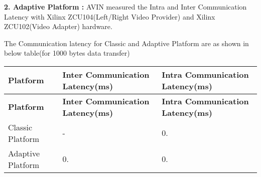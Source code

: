 {\bfseries 2. Adaptive Platform \+:} A\+V\+IN measured the Intra and Inter Communication Latency with Xilinx Z\+C\+U104(Left/\+Right Video Provider) and Xilinx Z\+C\+U102(\+Video Adapter) hardware.


\begin{DoxyItemize}
\item The Communication latency for Classic and Adaptive Platform are as shown in below table(for 1000 bytes data transfer)
\end{DoxyItemize}

\tabulinesep=1mm
\begin{longtabu} spread 0pt [c]{*{3}{|X[-1]}|}
\hline
\rowcolor{\tableheadbgcolor}\textbf{ Platform }&\textbf{ Inter Communication Latency(ms) }&\textbf{ Intra Communication Latency(ms)  }\\
\endfirsthead
\hline
\endfoot
\hline
\rowcolor{\tableheadbgcolor}\textbf{ Platform }&\textbf{ Inter Communication Latency(ms) }&\textbf{ Intra Communication Latency(ms)  }\\
\endhead
Classic Platform &-\/ &0. \\
Adaptive Platform &0. &0. \\
\end{longtabu}
